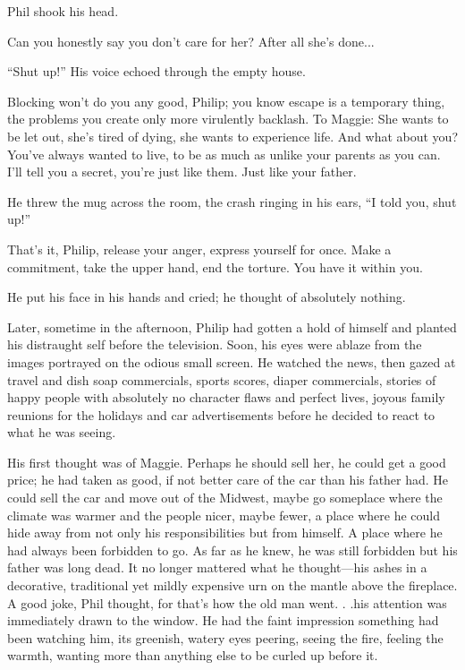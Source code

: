 \documentclass[
]{article}
\begin{document}
Phil shook his head.

Can you honestly say you don't care for her? After all she's done...

``Shut up!'' His voice echoed through the empty house.

Blocking won't do you any good, Philip; you know escape is a temporary
thing, the problems you create only more virulently backlash. To Maggie:
She wants to be let out, she's tired of dying, she wants to experience
life. And what about you? You've always wanted to live, to be as much as
unlike your parents as you can. I'll tell you a secret, you're just like
them. Just like your father.

He threw the mug across the room, the crash ringing in his ears, ``I
told you, shut up!''

That's it, Philip, release your anger, express yourself for once. Make a
commitment, take the upper hand, end the torture. You have it within
you.

He put his face in his hands and cried; he thought of absolutely
nothing.

Later, sometime in the afternoon, Philip had gotten a hold of himself
and planted his distraught self before the television. Soon, his eyes
were ablaze from the images portrayed on the odious small screen. He
watched the news, then gazed at travel and dish soap commercials, sports
scores, diaper commercials, stories of happy people with absolutely no
character flaws and perfect lives, joyous family reunions for the
holidays and car advertisements before he decided to react to what he
was seeing.

His first thought was of Maggie. Perhaps he should sell her, he could
get a good price; he had taken as good, if not better care of the car
than his father had. He could sell the car and move out of the Midwest,
maybe go someplace where the climate was warmer and the people nicer,
maybe fewer, a place where he could hide away from not only his
responsibilities but from himself. A place where he had always been
forbidden to go. As far as he knew, he was still forbidden but his
father was long dead. It no longer mattered what he thought---his ashes
in a decorative, traditional yet mildly expensive urn on the mantle
above the fireplace. A good joke, Phil thought, for that's how the old
man went. . .his attention was immediately drawn to the window. He had
the faint impression something had been watching him, its greenish,
watery eyes peering, seeing the fire, feeling the warmth, wanting more
than anything else to be curled up before it.
\end{document}
